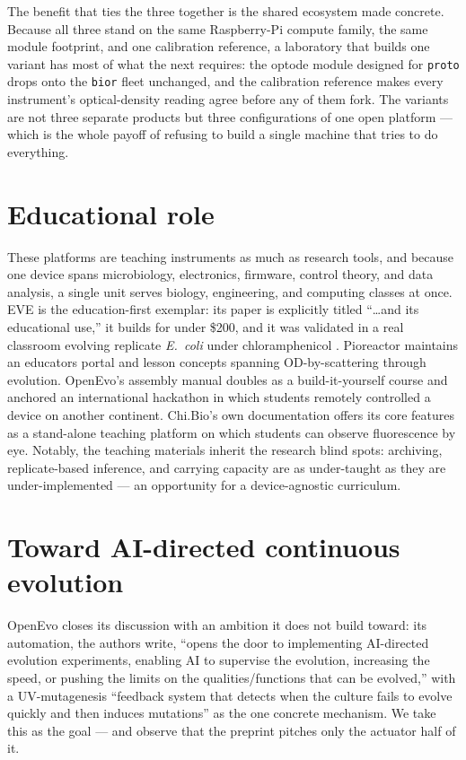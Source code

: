\documentclass[11pt,a4paper]{article}
\begin{document}
The benefit that ties the three together is the shared ecosystem made concrete. Because all three
stand on the same Raspberry-Pi compute family, the same module footprint, and one calibration
reference, a laboratory that builds one variant has most of what the next requires: the optode
module designed for \texttt{proto} drops onto the \texttt{bior} fleet unchanged, and the calibration
reference makes every instrument's optical-density reading agree before any of them fork. The
variants are not three separate products but three configurations of one open platform --- which is
the whole payoff of refusing to build a single machine that tries to do everything.

\section{Educational role}
\label{sec:education}

These platforms are teaching instruments as much as research tools, and because one device
spans microbiology, electronics, firmware, control theory, and data analysis, a single unit
serves biology, engineering, and computing classes at once. EVE is the education-first
exemplar: its paper is explicitly titled ``\dots and its educational use,'' it builds for under
\$200, and it was validated in a real classroom evolving replicate \emph{E.~coli} under
chloramphenicol \cite{gopalakrishnan2022eve}. Pioreactor maintains an educators portal and
lesson concepts spanning OD-by-scattering through evolution. OpenEvo's assembly manual doubles
as a build-it-yourself course and anchored an international hackathon in which students
remotely controlled a device on another continent. Chi.Bio's own documentation offers its core
features as a stand-alone teaching platform on which students can observe fluorescence by eye.
Notably, the teaching materials inherit the research blind spots: archiving, replicate-based
inference, and carrying capacity are as under-taught as they are under-implemented --- an
opportunity for a device-agnostic curriculum.

\section{Toward AI-directed continuous evolution}
\label{sec:aidirected}

OpenEvo closes its discussion with an ambition it does not build toward: its automation, the
authors write, ``opens the door to implementing AI-directed evolution experiments, enabling AI to
supervise the evolution, increasing the speed, or pushing the limits on the qualities/functions
that can be evolved,'' with a UV-mutagenesis ``feedback system that detects when the culture fails
to evolve quickly and then induces mutations'' as the one concrete mechanism. We take this as the
goal --- and observe that the preprint pitches only the actuator half of it.
\end{document}
